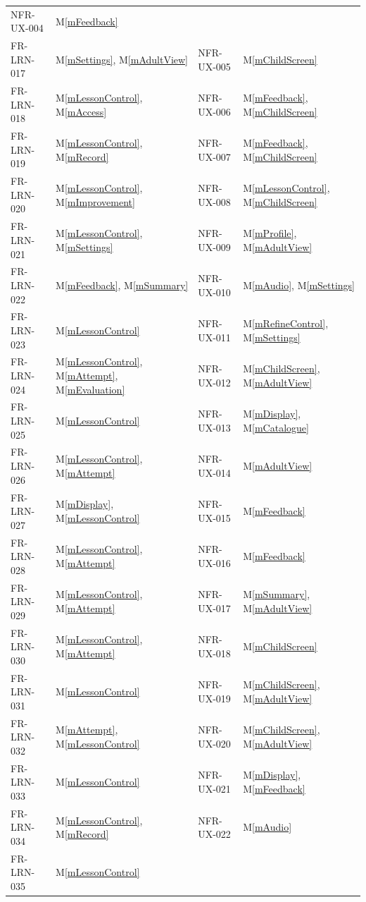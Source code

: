 \documentclass[12pt, titlepage]{article}
\newcommand{\mref}[1]{M\ref{#1}}
\begin{document}
{\begin{longtable}{@{}p{} p{} p{}
p{}@{}}
  NFR-UX-004 & \mref{mFeedback}\\
FR-LRN-017 & \mref{mSettings}, \mref{mAdultView} &
  NFR-UX-005 & \mref{mChildScreen}\\
FR-LRN-018 & \mref{mLessonControl}, \mref{mAccess} &
  NFR-UX-006 & \mref{mFeedback}, \mref{mChildScreen}\\
FR-LRN-019 & \mref{mLessonControl}, \mref{mRecord} &
  NFR-UX-007 & \mref{mFeedback}, \mref{mChildScreen}\\
FR-LRN-020 & \mref{mLessonControl}, \mref{mImprovement} &
  NFR-UX-008 & \mref{mLessonControl}, \mref{mChildScreen}\\
FR-LRN-021 & \mref{mLessonControl}, \mref{mSettings} &
  NFR-UX-009 & \mref{mProfile}, \mref{mAdultView}\\
FR-LRN-022 & \mref{mFeedback}, \mref{mSummary} &
  NFR-UX-010 & \mref{mAudio}, \mref{mSettings}\\
FR-LRN-023 & \mref{mLessonControl} &
  NFR-UX-011 & \mref{mRefineControl}, \mref{mSettings}\\
FR-LRN-024 & \mref{mLessonControl}, \mref{mAttempt}, \mref{mEvaluation} &
  NFR-UX-012 & \mref{mChildScreen}, \mref{mAdultView}\\
FR-LRN-025 & \mref{mLessonControl} &
  NFR-UX-013 & \mref{mDisplay}, \mref{mCatalogue}\\
FR-LRN-026 & \mref{mLessonControl}, \mref{mAttempt} &
  NFR-UX-014 & \mref{mAdultView}\\
FR-LRN-027 & \mref{mDisplay}, \mref{mLessonControl} &
  NFR-UX-015 & \mref{mFeedback}\\
FR-LRN-028 & \mref{mLessonControl}, \mref{mAttempt} &
  NFR-UX-016 & \mref{mFeedback}\\
FR-LRN-029 & \mref{mLessonControl}, \mref{mAttempt} &
  NFR-UX-017 & \mref{mSummary}, \mref{mAdultView}\\
FR-LRN-030 & \mref{mLessonControl}, \mref{mAttempt} &
  NFR-UX-018 & \mref{mChildScreen}\\
FR-LRN-031 & \mref{mLessonControl} &
  NFR-UX-019 & \mref{mChildScreen}, \mref{mAdultView}\\
FR-LRN-032 & \mref{mAttempt}, \mref{mLessonControl} &
  NFR-UX-020 & \mref{mChildScreen}, \mref{mAdultView}\\
FR-LRN-033 & \mref{mLessonControl} &
  NFR-UX-021 & \mref{mDisplay}, \mref{mFeedback}\\
FR-LRN-034 & \mref{mLessonControl}, \mref{mRecord} &
  NFR-UX-022 & \mref{mAudio}\\
FR-LRN-035 & \mref{mLessonControl} &

\end{longtable}}
\end{document}
